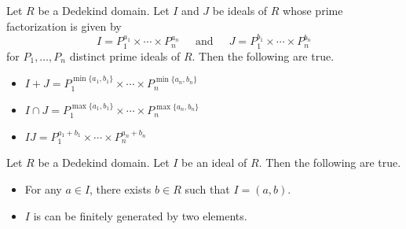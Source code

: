 \documentclass[a4paper]{article}
\begin{document}
\begin{prp}{}{} Let $R$ be a Dedekind domain. Let $I$ and $J$ be ideals of $R$ whose prime factorization is given by $$I=P_1^{a_1}\times\cdots\times P_n^{a_n}\;\;\;\;\text{ and }\;\;\;\;J=P_1^{b_1}\times\cdots\times P_n^{b_n}$$ for $P_1,\dots,P_n$ distinct prime ideals of $R$. Then the following are true. 
\begin{itemize}
\item $I+J=P_1^{\min\{a_1,b_1\}}\times\cdots\times P_n^{\min\{a_n,b_n\}}$
\item $I\cap J=P_1^{\max\{a_1,b_1\}}\times\cdots\times P_n^{\max\{a_n,b_n\}}$
\item $IJ=P_1^{a_1+b_1}\times\cdots\times P_n^{a_n+b_n}$
\end{itemize}
\end{prp}

\begin{prp}{}{} Let $R$ be a Dedekind domain. Let $I$ be an ideal of $R$. Then the following are true. 
\begin{itemize}
\item For any $a\in I$, there exists $b\in R$ such that $I=(a,b)$. 
\item $I$ is can be finitely generated by two elements. 
\end{itemize}
\end{prp}
\end{document}
